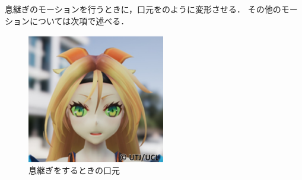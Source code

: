 息継ぎのモーションを行うときに，口元をのように変形させる．
その他のモーションについては次項で述べる．\\
\begin{figure}[!h]
	\centering
	\includegraphics[width=6cm]{fig/chap3/breath.eps}
	\caption{息継ぎをするときの口元}
	\label{fig:breath_mouth}
\end{figure}

